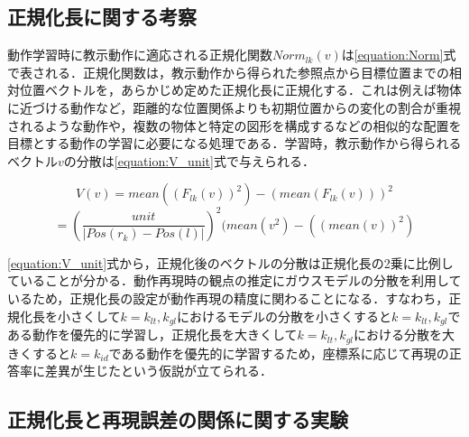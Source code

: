 \subsection{正規化長に関する考察}
\label{subsection:UNIT}
動作学習時に教示動作に適応される正規化関数$Norm_{lk}(v)$は\ref{equation:Norm}式で表される．正規化関数は，教示動作から得られた参照点から目標位置までの相対位置ベクトルを，あらかじめ定めた正規化長に正規化する．これは例えば物体に近づける動作など，距離的な位置関係よりも初期位置からの変化の割合が重視されるような動作や，複数の物体と特定の図形を構成するなどの相似的な配置を目標とする動作の学習に必要になる処理である．学習時，教示動作から得られるベクトル$v$の分散は\ref{equation:V_unit}式で与えられる．

\[
	V(v) = mean((F_{lk}(v))^{2}) - (mean(F_{lk}(v)))^{2}
\]
\begin{equation}
	\label{equation:V_unit}
	 = \left(\frac{unit}{| Pos(r_{k})-Pos(l) |}\right)^{2}(mean(v^{2}) - ((mean(v))^{2})
\end{equation}

\ref{equation:V_unit}式から，正規化後のベクトルの分散は正規化長の2乗に比例していることが分かる．動作再現時の観点の推定にガウスモデルの分散を利用しているため，正規化長の設定が動作再現の精度に関わることになる．すなわち，正規化長を小さくして$k=k_{lt} , k_{gl}$におけるモデルの分散を小さくすると$k=k_{lt} , k_{gl}$である動作を優先的に学習し，正規化長を大きくして$k=k_{lt} , k_{gl}$における分散を大きくすると$k=k_{id}$である動作を優先的に学習するため，座標系に応じて再現の正答率に差異が生じたという仮説が立てられる．

\subsection{正規化長と再現誤差の関係に関する実験}

